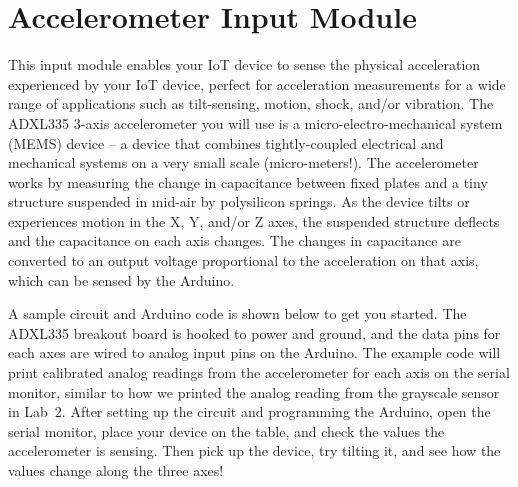 
\clearpage
\section{Accelerometer Input Module}
\label{sec-input-accel}

This input module enables your IoT device to sense the physical
acceleration experienced by your IoT device, perfect for acceleration
measurements for a wide range of applications such as tilt-sensing,
motion, shock, and/or vibration. The ADXL335 3-axis accelerometer you
will use is a micro-electro-mechanical system (MEMS) device -- a device
that combines tightly-coupled electrical and mechanical systems on a
very small scale (micro-meters!). The accelerometer works by measuring
the change in capacitance between fixed plates and a tiny structure
suspended in mid-air by polysilicon springs.  As the device tilts or
experiences motion in the X, Y, and/or Z axes, the suspended structure
deflects and the capacitance on each axis changes. The changes in
capacitance are converted to an output voltage proportional to the
acceleration on that axis, which can be sensed by the Arduino.

A sample circuit and Arduino code is shown below to get you started.
The ADXL335 breakout board is hooked to power and ground, and the data
pins for each axes are wired to analog input pins on the Arduino. The
example code will print calibrated analog
readings from the accelerometer for each axis on the serial monitor, similar to how we
printed the analog reading from the grayscale sensor in Lab~2. After
setting up the circuit and programming the Arduino, open the serial
monitor, place your device on the table, and check the values the
accelerometer is sensing. Then pick up the device, try tilting it, and
see how the values change along the three axes!

